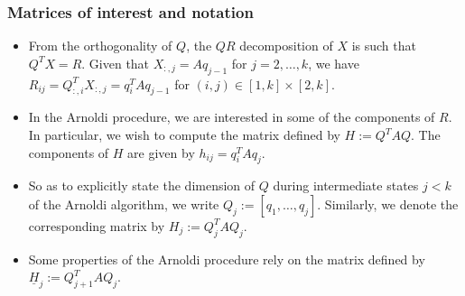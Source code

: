 \documentclass[t,usepdftitle=false]{beamer}
\begin{document}
\begin{frame}
\frametitle{Matrices of interest and notation}	
\begin{itemize}
\item From the orthogonality of $Q$, the $QR$ decomposition of $X$ is such that $Q^TX=R$. 
Given that $X_{:,j}=Aq_{j-1}$ for $j=2,\dots,k$, we have $R_{ij}=Q_{:,i}^TX_{:,j}=q_i^TAq_{j-1}$ for $(i,j)\in[1,k]\times[2,k]$.
\vspace{.1cm}
\item In the Arnoldi procedure, we are interested in some of the components of $R$.
In particular, we wish to compute the matrix defined by $H:=Q^TAQ$.
The components of $H$ are given by $h_{ij}=q_i^TAq_j$.
\vspace{.1cm}
\item So as to explicitly state the dimension of $Q$ during intermediate states $j<k$ of the Arnoldi algorithm, we write $Q_j:=[q_1,\dots,q_j]$.
Similarly, we denote the corresponding matrix by $H_j:=Q_j^TAQ_j$.
\vspace{.1cm}
\item Some properties of the Arnoldi procedure rely on the matrix defined by $\underline{H}_j:=Q_{j+1}^TAQ_j$.
\end{itemize}
\end{frame}   
\end{document}
